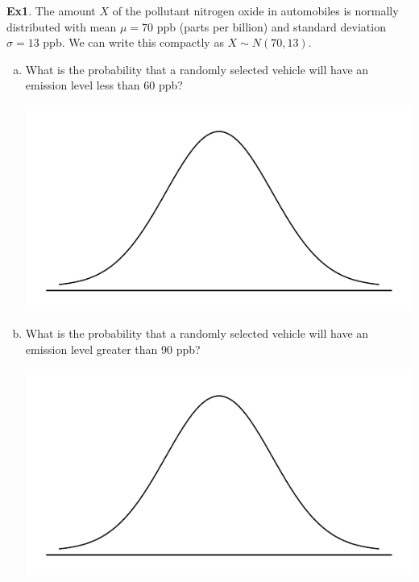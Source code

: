 \documentclass[fleqn, 11pt]{article}
\begin{document}
\clearpage
\textbf{Ex1}.  The amount $X$ of the pollutant nitrogen oxide in automobiles is normally distributed with mean $\mu=70$ ppb (parts per billion) and standard deviation $\sigma = 13$ ppb.  We can write this compactly as $X \sim N(70,13)$.
\begin{enumerate}[(a)]
\item What is the probability that a randomly selected vehicle will have an emission level less than 60 ppb?

\includegraphics[scale=0.6]{figure/norm_draw.pdf}
\vspace{2cm}

\item What is the probability that a randomly selected vehicle will have an emission level greater than 90 ppb?

\includegraphics[scale=0.6]{figure/norm_draw.pdf}
\vspace{2cm}


\end{enumerate}
\end{document}
